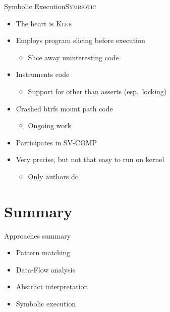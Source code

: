 \begin{frame}{Symbolic Execution}{\textsc{Symbiotic}}

  \begin{itemize}
    \item The heart is \textsc{Klee}

    \pause

    \item Employs program slicing before execution
    \begin{itemize}
      \item Slice away uninteresting code
    \end{itemize}

    \pause

    \item Instruments code
    \begin{itemize}
      \item Support for other than asserts (esp.\ locking)
    \end{itemize}

    \pause

    \item Crashed btrfs mount path code
    \begin{itemize}
      \item Ongoing work
    \end{itemize}

    \pause

    \item Participates in SV-COMP

    \pause

    \item Very precise, but not that easy to run on kernel
    \begin{itemize}
      \item Only authors do
    \end{itemize}
  \end{itemize}

\end{frame}

\section{Summary}
\frame{\sectionpage}

\begin{frame}{Approaches summary}

  \begin{itemize}
    \item Pattern matching
    \item Data-Flow analysis
    \item Abstract interpretation
    \item Symbolic execution
  \end{itemize}

\end{frame}

